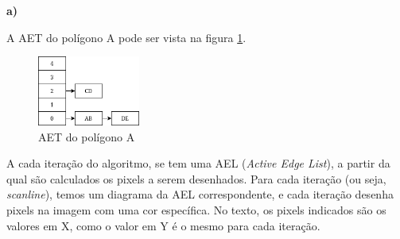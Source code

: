 \documentclass[12pt]{article}
\begin{document}
\textbf{a)}

A AET do polígono A pode ser vista na figura \ref{fig:3a_aet}.
\begin{figure}[H]
    \centering
    \includegraphics[width=0.3\textwidth]{images/3/3a_aet.png}
    \caption{AET do polígono A}
    \label{fig:3a_aet}
\end{figure}

A cada iteração do algoritmo, se tem uma AEL (\textit{Active Edge List}), a partir da qual são calculados os pixels a serem desenhados. Para cada iteração (ou seja, \textit{scanline}), temos um diagrama da AEL correspondente, e cada iteração desenha pixels na imagem com uma cor específica. No texto, os pixels indicados são os valores em X, como o valor em Y é o mesmo para cada iteração.
\end{document}

